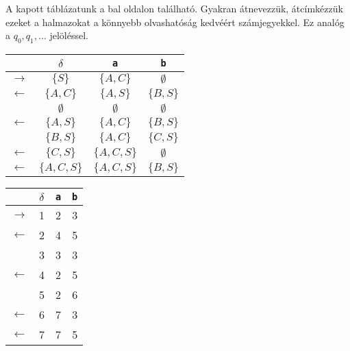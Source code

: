 \documentclass[a4paper,11pt]{article}
\begin{document}
A kapott táblázatunk a bal oldalon található. Gyakran átnevezzük, átcímkézzük ezeket a halmazokat a könnyebb olvashatóság kedvéért számjegyekkel. Ez analóg a $q_0, q_1, \dots$ jelöléssel.

\begin{minipage}{0.5\linewidth}
	\begin{center}
		\setlength{\tabcolsep}{0.5em} %
		{\renewcommand{\arraystretch}{1.5}%
			\begin{tabular}{cc||c|c}
				& $\delta$ & \texttt{a} & \texttt{b} \\
				\hline
				$\rightarrow$ & $\{S\}$ & $\{A, C\}$ & $\emptyset$ \\
				\hline
				$\leftarrow$ & $\{A, C\}$ & $\{A, S\}$ & $\{ B,S \}$ \\
				\hline
				& $ \emptyset$ & $\emptyset$ & $\emptyset$ \\
				\hline
				$\leftarrow$ & $\{A,S\}$ & $\{A,C\}$ & $\{B,S\}$ \\
				\hline
				& $\{B,S\}$ & $\{A,C\}$ & $\{C,S\}$ \\
				\hline
				$\leftarrow$ & $\{C,S\}$ & $\{A,C,S\}$ & $\emptyset$ \\
				\hline
				$\leftarrow$ & $\{A,C,S\}$ & $\{A,C,S\}$ & $\{B,S\}$
			\end{tabular}
		}
	\end{center}
\end{minipage}
\begin{minipage}{0.5\linewidth}
	\begin{center}
		\setlength{\tabcolsep}{0.5em} %
		{\renewcommand{\arraystretch}{1.5}%
			\begin{tabular}{cc||c|c}
				& $\delta$ & \texttt{a} & \texttt{b} \\
				\hline
				$\rightarrow$ & 1 & 2 & 3 \\
				\hline
				$\leftarrow$ & 2 & 4 & 5 \\
				\hline
				& 3 & 3 & 3 \\
				\hline
				$\leftarrow$ & 4 & 2 & 5 \\
				\hline
				& 5 & 2 & 6 \\
				\hline
				$\leftarrow$ & 6 & 7 & 3 \\
				\hline
				$\leftarrow$ & 7 & 7 & 5
			\end{tabular}
		}
	\end{center}
\end{minipage}
\end{document}
